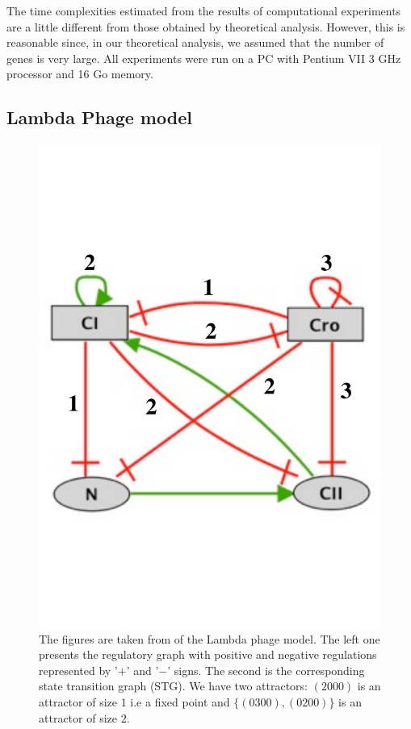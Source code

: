 
The time complexities estimated from the results of computational experiments are a little different from those obtained by theoretical analysis.  However, this is reasonable since, in our theoretical analysis, we assumed that the number of genes is very large.
All experiments were run on a PC with Pentium VII 3 GHz processor and 16 Go memory.

\subsection{Lambda Phage model}
\begin{figure}[h]
   \caption{\label{fig:lambda-graph} 
   The figures are taken from \cite{thieffry1995dynamical,chaouiya2008petri} of the Lambda phage model. The left one presents the regulatory graph with positive and negative regulations represented by ’$+$’ and ’$-$’ signs. The second is the corresponding state transition graph (STG).%
We have two attractors: $(2000)$ is an attractor of size $1$ i.e a fixed point and $\{(0300), (0200)\}$ is an attractor of size $2$.}
   \includegraphics{figures/lampdaphage-thomas.pdf}

\end{figure}

